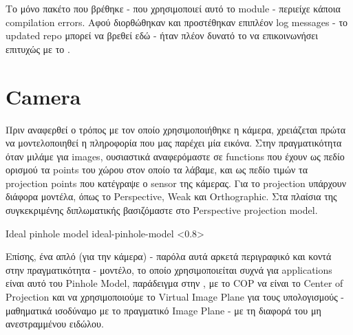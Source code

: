 Το μόνο  πακέτο που βρέθηκε \cite{ros-adafruit-10dof-imu-original} - που χρησιμοποιεί αυτό το module - περιείχε κάποια compilation errors. Αφού διορθώθηκαν και προστέθηκαν επιπλέον log messages - το updated repo μπορεί να βρεθεί εδώ \cite{ros-adafruit-10dof-imu-cspyridakis} - ήταν πλέον δυνατό το  να επικοινωνήσει επιτυχώς με το .


\section{Camera} \label{sec:design-implementation-camera}

Πριν αναφερθεί ο τρόπος με τον οποίο χρησιμοποιήθηκε η κάμερα, χρειάζεται πρώτα να μοντελοποιηθεί η πληροφορία που μας παρέχει μία εικόνα. Στην πραγματικότητα όταν μιλάμε για images, ουσιαστικά αναφερόμαστε σε functions που έχουν ως πεδίο ορισμού τα  points του χώρου στον οποίο τα λάβαμε, και ως πεδίο τιμών τα  projection points που κατέγραψε ο sensor της κάμερας. Για το projection υπάρχουν διάφορα μοντέλα, όπως το Perspective, Weak και Orthographic. Στα πλαίσια της συγκεκριμένης διπλωματικής βασιζόμαστε στο Perspective projection model.


%
{Ideal pinhole model}%
{ideal-pinhole-model}%
<0.8>

Επίσης, ένα απλό (για την κάμερα) - παρόλα αυτά αρκετά περιγραφικό και κοντά στην πραγματικότητα - μοντέλο, το οποίο χρησιμοποιείται συχνά για  applications είναι αυτό του Pinhole Model, παράδειγμα στην , με το COP να είναι το Center of Projection και να χρησιμοποιούμε το Virtual Image Plane για τους υπολογισμούς - μαθηματικά ισοδύναμο με το πραγματικό Image Plane - με τη διαφορά του μη ανεστραμμένου ειδώλου.

